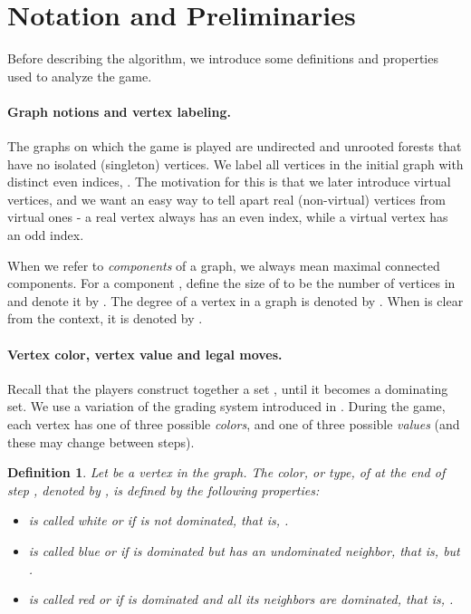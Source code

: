 \documentclass[11pt]{article}
\def\dnsitem{\vspace{-7pt}\item}
\newtheorem{definition}[theorem]{Definition}
\theoremstyle{definition}
\begin{document}
\section{Notation and Preliminaries}
\label{section:dom_game_notations}

Before describing the algorithm, we introduce some definitions and properties used to analyze the game.

\paragraph{Graph notions and vertex labeling.}
The graphs on which the game is played are undirected and unrooted forests that have no isolated (singleton) vertices.
We label all vertices in the initial graph  with distinct even indices, .
The motivation for this is that we later introduce virtual vertices,
and we want an easy way to tell apart real (non-virtual) vertices from virtual ones - a real vertex  always has an even index, while a virtual vertex  has an odd index.

When we refer to \emph{components} of a graph, we always mean maximal connected components.
For a component , define the size of  to be the number of vertices in  and denote it by .
The degree of a vertex  in a graph  is denoted by . When  is clear from the context, it is denoted by .


\paragraph{Vertex color, vertex value and legal moves.}
Recall that the players construct together a set , until it becomes a dominating set.
We use a variation of the grading system introduced in \cite{bujtas2015domination}.
During the game, each vertex has one of three possible \emph{colors}, and one of three possible \emph{values} 
(and these may change between steps).

\begin{definition}
Let  be a vertex in the graph.
The \emph{color}, or \emph{type}, of  at the end of step , denoted by , is defined by the following properties:
\begin{itemize}
	\dnsitem  is called \emph{white} or  if  is not dominated, that is, .
	\dnsitem  is called \emph{blue} or  if  is dominated but has an undominated neighbor, that is,  but .
	\dnsitem  is called \emph{red} or  if  is dominated and all its neighbors are dominated, that is, .
\end{itemize}
\end{definition}
\end{document}
